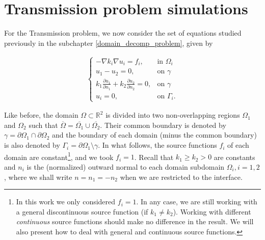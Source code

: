 

\section{Transmission problem simulations}\label{numerical_transmission_simulations}

For the Transmission problem, we now consider the set of equations studied previously in the subchapter \ref{domain_decomp_problem}, given by

\begin{align}\label{transmission_num}
    \begin{cases}
    - \nabla k_i \nabla u_i = f_i, & \text{in }\Omega_i\\
    u_1 - u_2 = 0, & \text{on }\gamma\\
    k_1 \frac{\partial u_1}{\partial n_1} + k_2 \frac{\partial u_2}{\partial n_2} = 0, & \text{on }\gamma\\
    u_i = 0, & \text{on }\Gamma_i.
    \end{cases}
\end{align}

Like before, the domain \(\Omega \subset \mathbb{R}^2\) is divided into two non-overlapping regions \(\Omega_1\) and \(\Omega_2\) such that \(\overline{\Omega} = \overline{\Omega_1} \cup \overline{\Omega_2}\). Their common boundary is denoted by \(\gamma = \partial\Omega_1 \cap \partial\Omega_2\) and the boundary of each domain (minus the common boundary) is also denoted by \(\Gamma_i = \partial\Omega_1\setminus{\gamma}\). In what follows, the source functions \(f_i\) of each domain are constant\footnote{In this work we only considered \(f_i=1\). In any case, we are still working with a general discontinuous source function (if \(k_1 \neq k_2\)). Working with different \textit{continuous} source functions should make no difference in the result. We will also present how to deal with general and continuous source functions.}, and we took \(f_i = 1\). Recall that \(k_1 \geq k_2 > 0\) are constants and \(n_i\) is the (normalized) outward normal to each domain subdomain \(\Omega_i, i=1, 2\), where we shall write \(n=n_1=-n_2\) when we are restricted to the interface.


